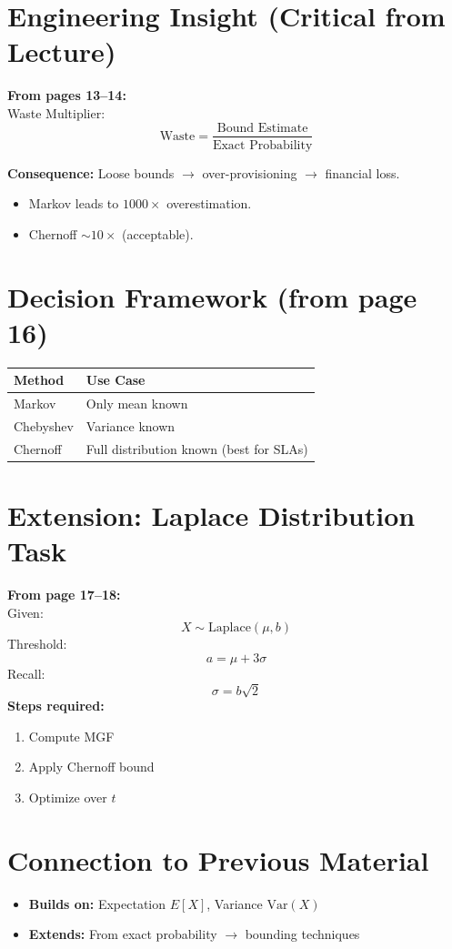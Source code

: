\documentclass[11pt]{article}
\begin{document}
\section{Engineering Insight (Critical from Lecture)}
\textbf{From pages 13–14:} \\
Waste Multiplier:
\[ \text{Waste} = \frac{\text{Bound Estimate}}{\text{Exact Probability}} \]

\textbf{Consequence:} Loose bounds $\rightarrow$ over-provisioning $\rightarrow$ financial loss.
\begin{itemize}
    \item Markov leads to $1000\times$ overestimation.
    \item Chernoff $\sim 10\times$ (acceptable).
\end{itemize}

\section{Decision Framework (from page 16)}
\begin{center}
\renewcommand{\arraystretch}{1.3}
\begin{tabular}{|l|l|}
\hline
\textbf{Method} & \textbf{Use Case} \\
\hline
Markov & Only mean known \\
Chebyshev & Variance known \\
Chernoff & Full distribution known (best for SLAs) \\
\hline
\end{tabular}
\end{center}

\section{Extension: Laplace Distribution Task}
\textbf{From page 17–18:} \\
Given:
\[ X \sim \text{Laplace}(\mu, b) \]
Threshold:
\[ a = \mu + 3\sigma \]
Recall:
\[ \sigma = b\sqrt{2} \]
\textbf{Steps required:}
\begin{enumerate}
    \item Compute MGF
    \item Apply Chernoff bound
    \item Optimize over $t$
\end{enumerate}

\section{Connection to Previous Material}
\begin{itemize}
    \item \textbf{Builds on:} Expectation $E[X]$, Variance $\text{Var}(X)$
    \item \textbf{Extends:} From exact probability $\rightarrow$ bounding techniques
\end{itemize}
\end{document}
